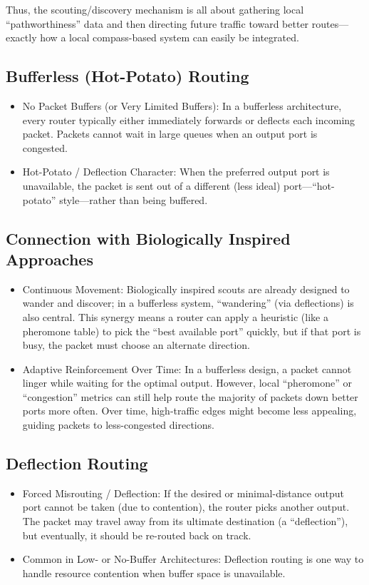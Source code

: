 Thus, the scouting/discovery mechanism is all about gathering local ``pathworthiness'' data and then directing future traffic toward better routes—exactly how a local compass-based system can easily be integrated.

\subsection{Bufferless (Hot-Potato) Routing}

\begin{itemize}
\item No Packet Buffers (or Very Limited Buffers): In a bufferless architecture, every router typically either immediately forwards or deflects each incoming packet. Packets cannot wait in large queues when an output port is congested.
\item Hot-Potato / Deflection Character: When the preferred output port is unavailable, the packet is sent out of a different (less ideal) port—``hot-potato'' style—rather than being buffered.
\end{itemize}

\subsection{Connection with Biologically Inspired Approaches}
\begin{itemize}
\item Continuous Movement: Biologically inspired scouts are already designed to wander and discover; in a bufferless system, “wandering” (via deflections) is also central. This synergy means a router can apply a heuristic (like a pheromone table) to pick the “best available port” quickly, but if that port is busy, the packet must choose an alternate direction.
\item Adaptive Reinforcement Over Time: In a bufferless design, a packet cannot linger while waiting for the optimal output. However, local “pheromone” or “congestion” metrics can still help route the majority of packets down better ports more often. Over time, high-traffic edges might become less appealing, guiding packets to less-congested directions.
\end{itemize}

\subsection{Deflection Routing}

\begin{itemize}
\item Forced Misrouting / Deflection: If the desired or minimal-distance output port cannot be taken (due to contention), the router picks another output. The packet may travel away from its ultimate destination (a “deflection”), but eventually, it should be re-routed back on track.
\item Common in Low- or No-Buffer Architectures: Deflection routing is one way to handle resource contention when buffer space is unavailable.
\end{itemize}
%
